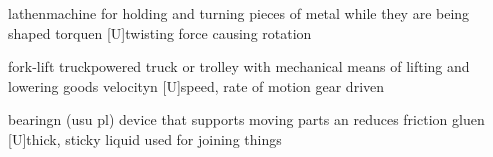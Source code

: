 \documentclass[a5paper,10pt,titlepage]{article}
\begin{document}
\begin{multicols}{2}
  {lathe}{}{n}{machine for holding and turning pieces of metal while they are being shaped}
  {torque}{}{n [U]}{twisting force causing rotation}
\end{multicols}


  {fork-lift truck}{}{}{powered truck or trolley with mechanical means of lifting and lowering goods}
  {velocity}{}{n [U]}{speed, rate of motion}
  {gear drive}{}{n}{}

  {bearing}{}{n (usu pl)}
  {device that supports moving parts an reduces friction}
  {glue}{}{n [U]}{thick, sticky liquid used for joining things}
\end{document}
